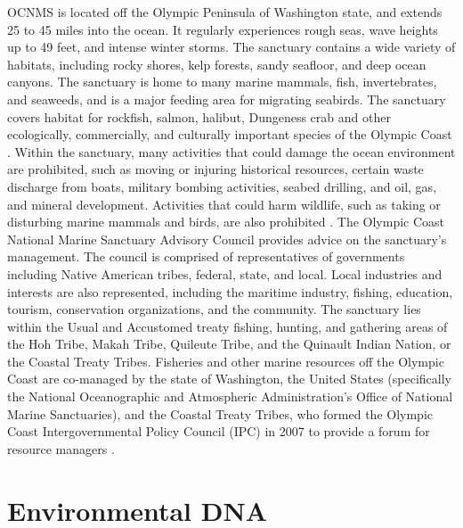 \documentclass[12pt,twoside]{reedthesis}
\begin{document}
OCNMS is located off the Olympic Peninsula of Washington state, and extends 25 to 45 miles into the ocean. It regularly experiences rough seas, wave heights up to 49 feet, and intense winter storms. The sanctuary contains a wide variety of habitats, including rocky shores, kelp forests, sandy seafloor, and deep ocean canyons. The sanctuary is home to many marine mammals, fish, invertebrates, and seaweeds, and is a major feeding area for migrating seabirds. The sanctuary covers habitat for rockfish, salmon, halibut, Dungeness crab and other ecologically, commercially, and culturally important species of the Olympic Coast \autocite{FishOlympicCoast}.  Within the sanctuary, many activities that could damage the ocean environment are prohibited, such as moving or injuring historical resources, certain waste discharge from boats, military bombing activities, seabed drilling, and oil, gas, and mineral development. Activities that could harm wildlife, such as taking or disturbing marine mammals and birds, are also prohibited \autocite{15CFRPart1995}. The Olympic Coast National Marine Sanctuary Advisory Council provides advice on the sanctuary's management. The council is comprised of representatives of governments including Native American tribes, federal, state, and local. Local industries and interests are also represented, including the maritime industry, fishing, education, tourism, conservation organizations, and the community. The sanctuary lies within the Usual and Accustomed treaty fishing, hunting, and gathering areas of the Hoh Tribe, Makah Tribe, Quileute Tribe, and the Quinault Indian Nation, or the Coastal Treaty Tribes. Fisheries and other marine resources off the Olympic Coast are co-managed by the state of Washington, the United States (specifically the National Oceanographic and Atmospheric Administration's Office of National Marine Sanctuaries), and the Coastal Treaty Tribes, who formed the Olympic Coast Intergovernmental Policy Council (IPC) in 2007 to provide a forum for resource managers \autocite{IntergovernmentalPolicyCouncil}.
	
\section{Environmental DNA}\label{IntroeDNA}
\end{document}
